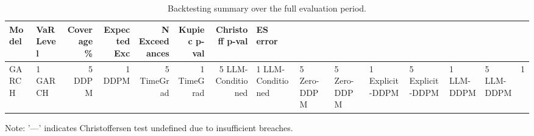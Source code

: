 \begin{table}[htbp]
\centering
\caption{Backtesting summary over the full evaluation period.}
\begin{tabular}{llrrrrrl}
\toprule
Model & VaR Level & Coverage \% & Expected Exc & N Exceedances & Kupiec p-val & Christoff p-val & ES error \\
\midrule
GARCH & 1%
GARCH & 5%
DDPM & 1%
DDPM & 5%
TimeGrad & 1%
TimeGrad & 5%
LLM-Conditioned & 1%
LLM-Conditioned & 5%
Zero-DDPM & 5%
Zero-DDPM & 1%
Explicit-DDPM & 5%
Explicit-DDPM & 1%
LLM-DDPM & 5%
LLM-DDPM & 1%
\bottomrule
\end{tabular}
\begin{tablenotes}
\item Note: '—' indicates Christoffersen test undefined due to insufficient breaches.
\end{tablenotes}
\end{table}
